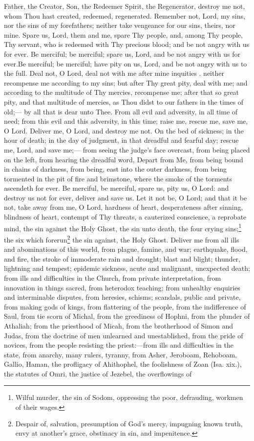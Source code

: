 Father, the Creator, Son, the Redeemer Spirit, the Regenerator, destroy me not, whom Thou hast created, redeemed, regenerated. Remember not, Lord, my sins, nor the sins of my forefathers; neither take vengeance for our sins, theirs, nor mine. Spare us, Lord, them and me, spare Thy people, and, among Thy people, Thy servant, who is redeemed with Thy precious blood; and be not angry with us for ever. Be merciful; be merciful; spare us, Lord, and be not angry with us for ever.Be merciful; be merciful; have pity on us, Lord, and be not angry with us to the full. Deal not, O Lord, deal not with me after mine inquities . neither recompense me according to my sins; but after Thy great pity, deal with me; and according to the multitude of Thy mercies, recompense me; after that so great pity, and that multitude of mercies, as Thou didst to our fathers in the times of old;— by all that is dear unto Thee. From all evil and adversity, in all time of need; from this evil and this adversity, in this time; raise me, rescue me, save me, O Lord. Deliver me, O Lord, and destroy me not. On the bed of sickness; in the hour of death; in the day of judgment, in that dreadful and fearful day; rescue me, Lord, and save me;— from seeing the judge’s face overcast, from being placed on the left, from hearing the dreadful word, Depart from Me, from being bound in chains of darkness, from being, east into the outer darkness, from being tormented in the pit of fire and brimstone, where the smoke of the torments ascendeth for ever. Be merciful, be merciful, spare us, pity us, O Lord: and destroy us not for ever, deliver and save us. Let it not be, O Lord; and that it be not, take away from me, O Lord, hardness of heart, desperateness after sinning, blindness of heart, contempt of Thy threats, a cauterized conscience, a reprobate mind, the sin against the Holy Ghost, the sin unto death, the four crying sins;\footnote{Wilful murder, the sin of Sodom, oppressing the poor, defrauding, workmen of their wages.} the six which forerun\footnote{Despair of, salvation, presumption of God’s mercy, impugning known truth, envy at another’s grace, obstinacy in sin, and impenitence.} the sin against, the Holy Ghost. Deliver me from all ills and abominations of this world, from plague, famine, and war; earthquake, flood, and fire, the stroke of immoderate rain and drought; blast and blight; thunder, lightning and tempest; epidemic sickness, acute and malignant, unexpected death; from ills and difficulties in the Church, from private interpretation, from innovation in things sacred, from heterodox teaching; from unhealthy enquiries and interminable disputes, from heresies, schisms; scandals, public and private, from making gods of kings, from flattering of the people, from the indifference of Saul, from tie scorn of Michal, from the greediness of Hophni, from the plunder of Athaliah; from the priesthood of Micah, from the brotherhood of Simon and Judas, from the doctrine of men unlearned and unestablished, from the pride of novices, from the people resisting the priest:—from ills and difficulties in the state, from anarchy, many rulers, tyranny, from Asher, Jeroboam, Rehoboam, Gallio, Haman, the profligacy of Ahithophel, the foolishness of Zoan (Isa. xix.), the statutes of Omri, the justice of Jezebel, the overflowings of 